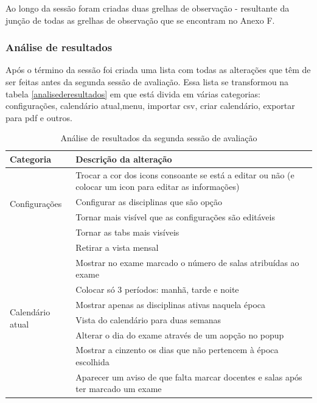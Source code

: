 \documentclass[11pt, twoside]{report}
\begin{document}
	Ao longo da sessão foram criadas duas grelhas de observação - resultante da junção de todas as grelhas de observação que se encontram no Anexo F.
	
	
	\subsubsection{Análise de resultados}
	
	Após o término da sessão foi criada uma lista com todas as alterações que têm de ser feitas antes da segunda sessão de avaliação. Essa lista se transformou na tabela \ref{analisederesultados} em que está divida em várias categorias: configurações, calendário atual,menu, importar csv, criar calendário, exportar para pdf e outros.
	

	\begin{center}
		\label{analisederesultados}
		\begin{longtable}{|m{2.2cm}|m{12cm}|}
			\caption{Análise de resultados da segunda sessão de avaliação}\\
			
			\hline			
			 \textbf{Categoria}&\textbf{Descrição da alteração} \\
			\hline
			
			\multirow{4}{2cm}{Configurações}& Trocar a cor dos icons consoante se está a editar ou não (e colocar um icon para editar as informações) \\
			
			& Configurar as disciplinas que são opção \\
			
			&Tornar mais visível que as configurações são editáveis \\
			
			&Tornar as tabs mais visíveis\\
			
			\hline
			\multirow{8}{2cm}{Calendário atual}& Retirar a vista mensal \\
			& Mostrar no exame marcado o número de salas atribuídas ao exame\\
			& Colocar só 3 períodos: manhã, tarde e noite\\
			& Mostrar apenas as disciplinas ativas naquela época\\
			& Vista do calendário para duas semanas\\
			&Alterar o dia do exame através de um aopção no popup\\
			&Mostrar a cinzento os dias que não pertencem à época escolhida\\
			&Aparecer um aviso de que falta marcar docentes e salas após ter marcado um exame\\
			

\end{longtable}
\end{center}
\end{document}
